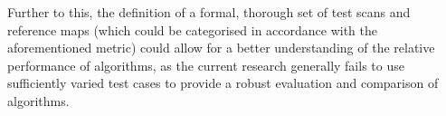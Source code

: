 \documentclass[authoryearcitations]{UoYCSproject}
\begin{document}
Further to this, the definition of a formal, thorough set of test scans and reference maps (which could be categorised in accordance with the aforementioned metric) could allow for a better understanding of the relative performance of algorithms, as the current research generally fails to use sufficiently varied test cases to provide a robust evaluation and comparison of algorithms.


\color{black}
\clearpage


\end{document}
